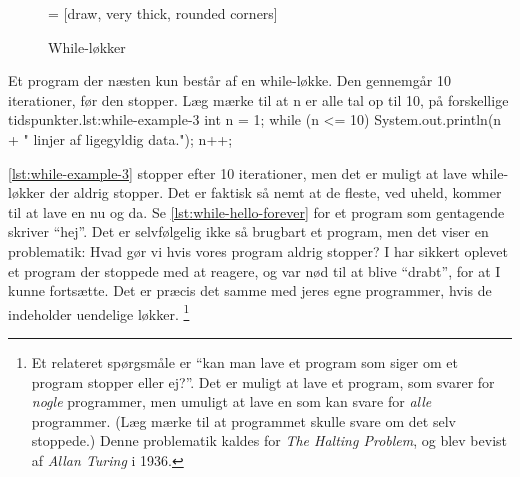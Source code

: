         \begin{figure}
        \center
         = [draw, very thick, rounded corners]
        \caption{While-løkker}
        \label{fig:while-loop-illustrated}
        \end{figure}

		\begin{JavaCode}{Et program der næsten kun består af en while-løkke. Den gennemgår 10 iterationer, før den stopper. Læg mærke til at n er alle tal op til 10, på forskellige tidspunkter.}{lst:while-example-3}
			int n = 1;
			while (n <= 10) {
				System.out.println(n + " linjer af ligegyldig data.");
				n++;
			}
		\end{JavaCode}

        \autoref{lst:while-example-3} stopper efter 10
        iterationer, men det er muligt at lave while-løkker der aldrig
        stopper.  Det er faktisk så nemt at de fleste, ved uheld,
        kommer til at lave en nu og da. Se
        \autoref{lst:while-hello-forever} for et program som
        gentagende skriver ``hej''. Det er selvfølgelig ikke så
        brugbart et program, men det viser en problematik: Hvad gør vi
        hvis vores program aldrig stopper? I har sikkert oplevet et
        program der stoppede med at reagere, og var nød til at blive
        ``drabt'', for at I kunne fortsætte. Det er præcis det samme
        med jeres egne programmer, hvis de indeholder uendelige
        løkker. \footnote{Et relateret spørgsmåle er ``kan man lave et
        program som siger om et program stopper eller ej?''. Det er
        muligt at lave et program, som svarer for \emph{nogle}
        programmer, men umuligt at lave en som kan svare for
        \emph{alle} programmer.  (Læg mærke til at programmet skulle
        svare om det selv stoppede.) Denne problematik kaldes for
        \emph{The Halting Problem}, og blev bevist af \emph{Allan
        Turing} i 1936.}

